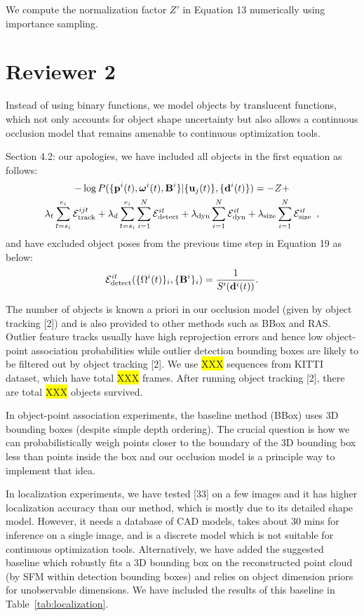 \documentclass[10pt,twocolumn,letterpaper]{article}
\newcommand{\hili}[1]{\colorbox{yellow}{#1}}
\begin{document}
We compute the normalization factor $Z'$ in Equation 13 numerically using importance sampling.

\section{Reviewer 2}

Instead of using binary functions, we model objects by translucent functions, which not only accounts for object shape uncertainty but also allows a continuous occlusion model that remains amenable to continuous optimization tools. 

Section 4.2: our apologies, we have included all objects in the first equation as follows:
\begin{multline*}
  -\log{P(\{ \mathbf{p}^i(t) , \bm{\omega}^i(t) , \mathbf{B}^i \} | \{\mathbf{u}_j(t)\} , \{\mathbf{d}^{i}(t)\} )} = -Z + \\ 
  \lambda_t \sum_{t=s_i}^{e_i} \mathcal{E}^{ijt}_{\text{track}}
  + 
  \lambda_d \sum_{t=s_i}^{e_i} \sum_{i=1}^N \mathcal{E}^{it}_{\text{detect}}
  + 
  \lambda_{\text{dyn}} \sum_{i=1}^N \mathcal{E}^{it}_{\text{dyn}}
  + 
  \lambda_{\text{size}} \sum_{i=1}^N \mathcal{E}^{it}_{\text{size}}
  \enspace,
\end{multline*}
and have excluded object poses from the previous time step in Equation 19 as below:
\begin{align*}
\mathcal{E}^{it}_{\text{detect}}(\{ \Omega^{i}(t) \}_i, \{\mathbf{B}^{i}\}_i ) = \frac{1}{S'(\mathbf{d}^{i}(t))}.
\end{align*}

The number of objects is known a priori in our occlusion model (given by object tracking [2]) and is also provided to other methods such as BBox and RAS. Outlier feature tracks usually have high reprojection errors and hence low object-point association probabilities while outlier detection bounding boxes are likely to be filtered out by object tracking [2]. We use \hili{XXX} sequences from KITTI dataset, which have total \hili{XXX} frames. After running object tracking [2], there are total \hili{XXX} objects survived.

In object-point association experiments, the baseline method (BBox) uses 3D bounding boxes (despite simple depth ordering). The crucial question is how we can probabilistically weigh points closer to the boundary of the 3D bounding box less than points inside the box and our occlusion model is a principle way to implement that idea.

In localization experiments, we have tested [33] on a few images and it has higher localization accuracy than our method, which is mostly due to its detailed shape model. However, it needs a database of CAD models, takes about 30 mins for inference on a single image, and is a discrete model which is not suitable for continuous optimization tools. Alternatively, we have added the suggested baseline which robustly fits a 3D bounding box on the reconstructed point cloud (by SFM within detection bounding boxes) and relies on object dimension priors for unobservable dimensions. We have included the results of this baseline in Table~\ref{tab:localization}.
\end{document}
